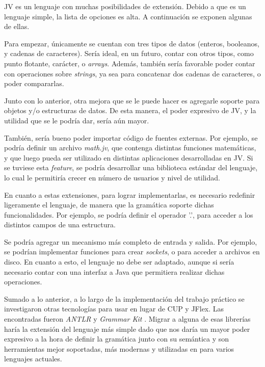 \documentclass[spanish]{article}
\begin{document}
        \par JV es un lenguaje con muchas posibilidades de extensión. Debido a que es un lenguaje simple, la lista de opciones es alta. A continuación se exponen algunas de ellas.
        \\
        \par Para empezar, únicamente se cuentan con tres tipos de datos (enteros, booleanos, y cadenas de caracteres). Sería ideal, en un futuro, contar con otros tipos, como punto flotante, carácter, o \textit{arrays}. Además, también sería favorable poder contar con operaciones sobre \textit{strings}, ya sea para concatenar dos cadenas de caracteres, o poder compararlas.
        \par Junto con lo anterior, otra mejora que se le puede hacer es agregarle soporte para objetos y/o estructuras de datos. De esta manera, el poder expresivo de JV, y la utilidad que se le podría dar, sería aún mayor.
        \par También, sería bueno poder importar código de fuentes externas. Por ejemplo, se podría definir un archivo \textit{math.jv}, que contenga distintas funciones matemáticas, y que luego pueda ser utilizado en distintas aplicaciones desarrolladas en JV. Si se tuviese esta \textit{feature}, se podría desarrollar una biblioteca estándar del lenguaje, lo cual le permitiría crecer en número de usuarios y nivel de utilidad.
        \par En cuanto a estas extensiones, para lograr implementarlas, es necesario redefinir ligeramente el lenguaje, de manera que la gramática soporte dichas funcionalidades. Por ejemplo, se podría definir el operador '.', para acceder a los distintos campos de una estructura.
        \par Se podría agregar un mecanismo más completo de entrada y salida. Por ejemplo, se podrían implementar funciones para crear \textit{sockets}, o para acceder a archivos en disco. En cuanto a esto, el lenguaje no debe ser adaptado, aunque si sería necesario contar con una interfaz a Java que permitiera realizar dichas operaciones.
            \par Sumado a lo anterior, a lo largo de la implementación del trabajo práctico se investigaron otras tecnologías para usar en lugar de CUP y JFlex. Las encontradas fueron \textit{ANTLR} \cite{antlr_home} y \textit{Grammar Kit} \cite{gkit_home}. Migrar a alguna de esas librerías haría la extensión del lenguaje más simple dado que nos daría un mayor poder expresivo a la hora de definir la gramática junto con su semántica y son herramientas mejor soportadas, más modernas y utilizadas en para varios lenguajes actuales.
    \clearpage
\end{document}
